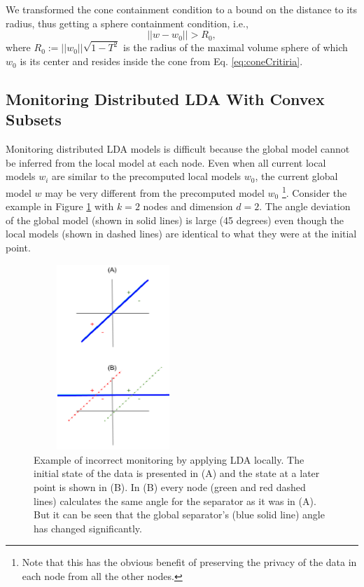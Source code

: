 We transformed the cone containment condition to a bound on the distance to its radius, thus getting a sphere containment condition, i.e., 
\begin{equation} \label{eq:critiria}
||w-w_0||   >  R_0,
\end{equation}
where $R_0 := ||w_0|| \sqrt{1-T^2}$ is the radius of the maximal volume sphere of which $w_0$ is its center and resides inside the cone from Eq. \ref{eq:coneCritiria}.


\subsection{Monitoring Distributed LDA With Convex Subsets}
Monitoring distributed LDA models is difficult because the
global model cannot be inferred from the local model at each
node. Even when all current local models $w_i$ are similar to the precomputed
local models $w_0$, the current global model $w$ may
be very different from the precomputed model $w_0$
\footnote{Note that this has the obvious benefit of preserving the privacy
of the data in each node from all the other nodes.}.
Consider the example in Figure \ref{NegativeExample} with $k = 2$ nodes
and dimension $d =2$.
The angle deviation of the global model (shown in solid lines) is large (45 degrees)
even though the local models (shown in dashed lines) are identical to what they
were at the initial point.

\begin{figure}[h]
\centering
\includegraphics[width=60mm, height=7cm]{NegativeExample.png}
\caption{Example of incorrect monitoring by applying LDA locally. The
initial state of the data is presented in (A) and the state at a later point
is shown in (B). In (B) every node (green and red dashed lines) calculates the same angle
for the separator as it was in (A). But it can be
seen that the global separator's (blue solid line) angle has changed
significantly.}
\label{NegativeExample}
\end{figure}


